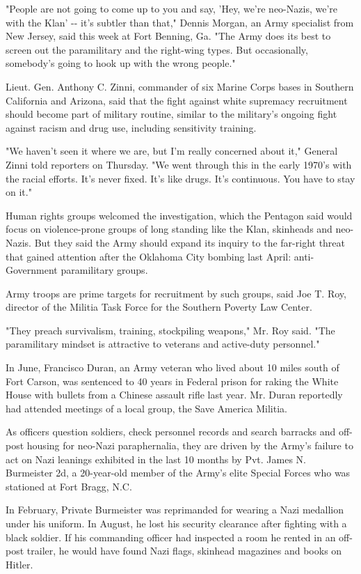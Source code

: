 "People are not going to come up to you and say, 'Hey, we're neo-Nazis,
we're with the Klan' -\/- it's subtler than that," Dennis Morgan, an
Army specialist from New Jersey, said this week at Fort Benning, Ga.
"The Army does its best to screen out the paramilitary and the
right-wing types. But occasionally, somebody's going to hook up with the
wrong people."

Lieut. Gen. Anthony C. Zinni, commander of six Marine Corps bases in
Southern California and Arizona, said that the fight against white
supremacy recruitment should become part of military routine, similar to
the military's ongoing fight against racism and drug use, including
sensitivity training.

"We haven't seen it where we are, but I'm really concerned about it,"
General Zinni told reporters on Thursday. "We went through this in the
early 1970's with the racial efforts. It's never fixed. It's like drugs.
It's continuous. You have to stay on it."

Human rights groups welcomed the investigation, which the Pentagon said
would focus on violence-prone groups of long standing like the Klan,
skinheads and neo-Nazis. But they said the Army should expand its
inquiry to the far-right threat that gained attention after the Oklahoma
City bombing last April: anti-Government paramilitary groups.

Army troops are prime targets for recruitment by such groups, said Joe
T. Roy, director of the Militia Task Force for the Southern Poverty Law
Center.

"They preach survivalism, training, stockpiling weapons," Mr. Roy said.
"The paramilitary mindset is attractive to veterans and active-duty
personnel."

In June, Francisco Duran, an Army veteran who lived about 10 miles south
of Fort Carson, was sentenced to 40 years in Federal prison for raking
the White House with bullets from a Chinese assault rifle last year. Mr.
Duran reportedly had attended meetings of a local group, the Save
America Militia.

As officers question soldiers, check personnel records and search
barracks and off-post housing for neo-Nazi paraphernalia, they are
driven by the Army's failure to act on Nazi leanings exhibited in the
last 10 months by Pvt. James N. Burmeister 2d, a 20-year-old member of
the Army's elite Special Forces who was stationed at Fort Bragg, N.C.

In February, Private Burmeister was reprimanded for wearing a Nazi
medallion under his uniform. In August, he lost his security clearance
after fighting with a black soldier. If his commanding officer had
inspected a room he rented in an off-post trailer, he would have found
Nazi flags, skinhead magazines and books on Hitler.

